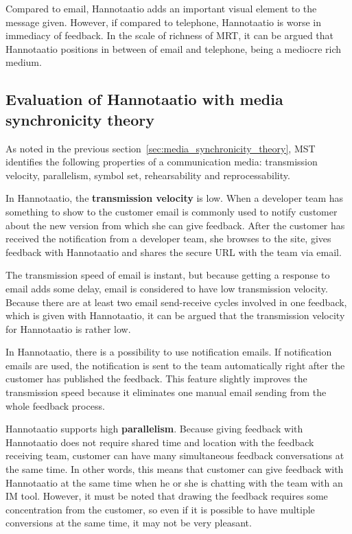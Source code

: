 \documentclass[english,12pt,a4paper,pdftex]{article}
\begin{document}
Compared to email, Hannotaatio adds an important visual element to the message given. However, if compared to telephone, Hannotaatio is worse in immediacy of feedback. In the scale of richness of \ac{MRT}, it can be argued that Hannotaatio positions in between of email and telephone, being a mediocre rich medium.

\subsection{Evaluation of Hannotaatio with media synchronicity theory}

As noted in the previous section~\ref{sec:media_synchronicity_theory}, \ac{MST} identifies the following properties of a communication media: transmission velocity, parallelism, symbol set, rehearsability and reprocessability.

In Hannotaatio, the \textbf{transmission velocity} is low. When a developer team has something to show to the customer email is commonly used to notify customer about the new version from which she can give feedback. After the customer has received the notification from a developer team, she browses to the site, gives feedback with Hannotaatio and shares the secure \ac{URL} with the team via email.

The transmission speed of email is instant, but because getting a response to email adds some delay, email is considered to have low transmission velocity. Because there are at least two email send-receive cycles involved in one feedback, which is given with Hannotaatio, it can be argued that the transmission velocity for Hannotaatio is rather low.

In Hannotaatio, there is a possibility to use notification emails. If notification emails are used, the notification is sent to the team automatically right after the customer has published the feedback. This feature slightly improves the transmission speed because it eliminates one manual email sending from the whole feedback process.

Hannotaatio supports high \textbf{parallelism}. Because giving feedback with Hannotaatio does not require shared time and location with the feedback receiving team, customer can have many simultaneous feedback conversations at the same time. In other words, this means that customer can give feedback with Hannotaatio at the same time when he or she is chatting with the team with an \ac{IM} tool. However, it must be noted that drawing the feedback requires some concentration from the customer, so even if it is possible to have multiple conversions at the same time, it may not be very pleasant.
\end{document}
